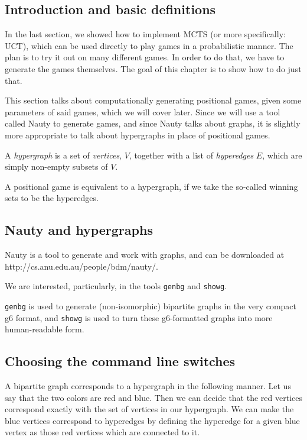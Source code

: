 \subsection{Introduction and basic definitions}

In the last section, we showed how to implement MCTS (or more specifically: UCT), which can be used directly to play games in a probabilistic manner.
The plan is to try it out on many different games.
In order to do that, we have to generate the games themselves.
The goal of this chapter is to show how to do just that.

This section talks about computationally generating positional games, given some parameters of said games, which we will cover later.
Since we will use a tool called Nauty to generate games, and since Nauty talks about graphs, it is slightly more appropriate to talk about hypergraphs in place of positional games.

\begin{definition}
  A \emph{hypergraph} is a set of \emph{vertices}, $V$, together with a list of \emph{hyperedges} $E$, which are simply non-empty subsets of $V$.
\end{definition}


A positional game is equivalent to a hypergraph, if we take the so-called winning sets to be the hyperedges.



\subsection{Nauty and hypergraphs}


Nauty is a tool to generate and work with graphs, and can be downloaded at http://cs.anu.edu.au/people/bdm/nauty/.

We are interested, particularly, in the tools \texttt{genbg} and \texttt{showg}.

\texttt{genbg} is used to generate (non-isomorphic) bipartite graphs in the very compact g6 format, and \texttt{showg} is used to turn these g6-formatted graphs into more human-readable form.


\subsection{Choosing the command line switches}
\label{sec:nautycommandline}

A bipartite graph corresponds to a hypergraph in the following manner.
Let us say that the two colors are red and blue. Then we can decide that the red vertices correspond exactly with the set of vertices in our hypergraph.
We can make the blue vertices correspond to hyperedges by defining the hyperedge for a given blue vertex as those red vertices which are connected to it.


